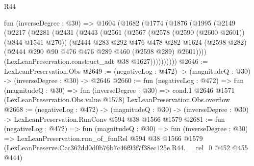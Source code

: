 \begin{lexlean}{R44}
\begin{coremodule}
  fun (inverseDegree : @30) =>
  @1604
    (@1682
      (@1774
        (@1876
          (@1995
            (@2149
              (@2217
                (@2281
                  (@2431
                    (@2443
                      (@2561
                        (@2567
                          (@2578 (@2590 (@2600 @2601)) (@844 @1541 @270))
                          (@2444
                            @283
                            @292
                            @476
                            @478
                            @282
                            @1624
                            (@2598 @282)
                            (@2444 @290 @90 @476 @476 @289 @460 (@2598 @289) @2601))))
                      (LexLeanPreservation.construct_adt @38 @1627))))))))))
@2646 := LexLeanPreservation.Obs
@2649 := (negativeLog : @472) -> (magnitudeQ : @30) -> (inverseDegree : @30) -> @2646
@2660 := fun (negativeLog : @472) =>
  fun (magnitudeQ : @30) =>
  fun (inverseDegree : @30) =>
  cond.{1} @2646 @1571 (LexLeanPreservation.Obs.value @1578) LexLeanPreservation.Obs.overflow
@2668 := (negativeLog : @472) ->
  (magnitudeQ : @30) -> (inverseDegree : @30) -> LexLeanPreservation.RunConv @594 @38 @1566 @1579
@2681 := fun (negativeLog : @472) =>
  fun (magnitudeQ : @30) =>
  fun (inverseDegree : @30) =>
  LexLeanPreservation.run_of_funRel
    @594
    @38
    @1566
    @1579
    (LexLeanPreserve.Ccc362dd0d0b76b7c46f93f7f38ec125e.R44.__rel_0 @452 @455 @444)
\end{coremodule}
\end{lexlean}
